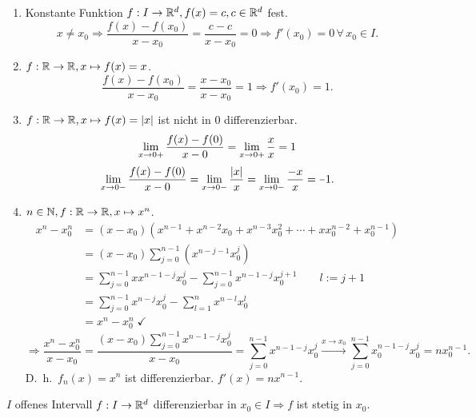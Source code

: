 \documentclass[../ana1.tex]{subfiles}
\begin{document}
\begin{bspe}
    \begin{enumerate}
        \item 
        Konstante Funktion \( f : I \rightarrow \mathbb{R}^d, f(x) = c, 
        c \in \mathbb{R}^d \) fest.
        \[ x \neq x_0 \Rightarrow \frac{f(x) - f(x_0)}{x-x_0} 
        = \frac{c - c}{x - x_0} = 0 \Rightarrow f'(x_0) = 0 
        \,\forall \, x_0 \in I. \]
        \item 
        \( f: \mathbb{R} \rightarrow \mathbb{R}, x \mapsto f(x) = x \). \\
        \[ \frac{f(x) - f(x_0)}{ x-x_0 } 
        = \frac{x - x_0}{x - x_0} = 1 \Rightarrow f'(x_0) = 1. \]
        \item 
        \( f : \mathbb{R} \rightarrow \mathbb{R}, x \mapsto f(x) = \left|x\right| \)
        ist nicht in \(0\) differenzierbar. 
        \[ \lim\limits_{x\rightarrow 0+} \frac{f(x) - f(0)}{x - 0} 
        = \lim\limits_{x\rightarrow 0+} \frac{x}{x} = 1 \]
        \[ \limesx{x}{0-} \frac{f(x) - f(0)}{x - 0} 
        = \limesx{x}{0-} \frac{\abs{x}}{x} 
        = \limesx{x}{0-} \frac{-x}{x} = \minus 1. \]
        \item 
        \( n\in\mathbb{N}, f: \mathbb{R} \rightarrow \mathbb{R}, x \mapsto x^n \).
        \begin{align*}
            x^n - x_0^n &= (x-x_0)( x^{n-1} + x^{n-2}x_0 
            + x^{n-3}x_0^2 + \cdots + x x_0^{n-2} + x_0^{n-1} )\\
            &= (x - x_0) \sum_{j=0}^{n-1} (x^{n-j-1} x_0^j) \\
            &= \sum_{j=0}^{n-1} x x^{n-1-j} x_0^j 
            - \sum_{j=0}^{n-1} x^{n-1-j} x_0^{j+1} \qquad l := j+1\\
            &= \sum_{j=0}^{n-1} x^{n-j} x_0^j - \sum_{l=1}^n x^{n-l} x_0^l \\
            &= x^n - x_0^n \; \checkmark
        \end{align*}
        \[ \Rightarrow \frac{x^n - x_0^n}{ x - x_0 } 
        = \frac{ (x - x_0) \sum_{j=0}^{n-1} x^{n-1-j}x_0^j }{x-x_0}
        = \sum_{j=0}^{n-1} x^{n-1-j} x_0^j \overset{
            x \rightarrow x_0}{\longrightarrow
        } \sum_{j=0} ^{n-1} x_0^{n-1-j} x_0^j = n x_0^{n-1}. \]
        D.\ h.\  \( f_n(x) = x^n \) ist differenzierbar. 
        \( f'(x) = n x^{n-1} \).
    \end{enumerate}
\end{bspe}
\begin{satz}
    \( I \) offenes Intervall \( f : I \rightarrow \mathbb{R}^d \) 
    differenzierbar in \( x_0 \in I \Rightarrow f \) ist stetig 
    in \(x_0\).
\end{satz}
\end{document}
